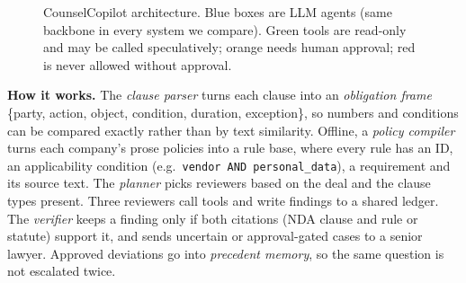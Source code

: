 \documentclass[11pt,a4paper]{article}
\begin{document}
\begin{figure}[H]
{}
\caption{CounselCopilot architecture. Blue boxes are LLM agents (same backbone in every system we compare). Green tools are read-only and may be called speculatively; orange needs human approval; red is never allowed without approval.}
\end{figure}

\textbf{How it works.} The \emph{clause parser} turns each clause into an \emph{obligation frame} \{party, action, object, condition, duration, exception\}, so numbers and conditions can be compared exactly rather than by text similarity. Offline, a \emph{policy compiler} turns each company's prose policies into a rule base, where every rule has an ID, an applicability condition (e.g.\ \texttt{vendor AND personal\_data}), a requirement and its source text. The \emph{planner} picks reviewers based on the deal and the clause types present. Three reviewers call tools and write findings to a shared ledger. The \emph{verifier} keeps a finding only if both citations (NDA clause and rule or statute) support it, and sends uncertain or approval-gated cases to a senior lawyer. Approved deviations go into \emph{precedent memory}, so the same question is not escalated twice.
\end{document}
